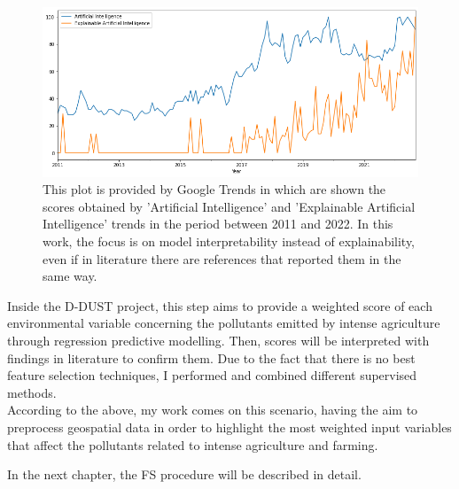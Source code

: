 \begin{figure}[H]
    \includegraphics[scale=0.50]{images/AI_XAI.png}
    \caption{This plot is provided by Google Trends in which are shown the scores obtained by 'Artificial Intelligence' and 'Explainable Artificial Intelligence' trends in the period between 2011 and 2022. In this work, the focus is on model interpretability instead of explainability, even if in literature there are references that reported them in the same way.}
    \label{fig:AI_XAI}
\end{figure}
\bigbreak
Inside the D-DUST project, this step aims to provide a weighted score of each environmental variable concerning the pollutants emitted by intense agriculture through regression predictive modelling. Then, scores will be interpreted with findings in literature to confirm them.
Due to the fact that there is no best feature selection techniques, I performed and combined different supervised methods. 
\\
According to the above, my work comes on this scenario, having the aim to preprocess geospatial data in order to highlight the most weighted input variables that affect the pollutants related to intense agriculture and farming.\par
In the next chapter, the FS procedure will be described in detail.
